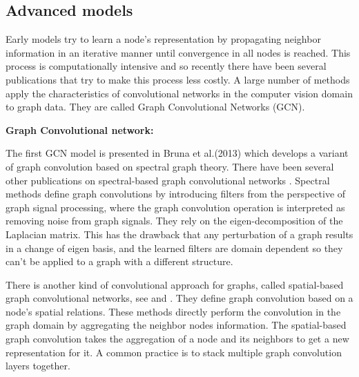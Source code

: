 \subsection{Advanced models} 





Early models try to learn a node's representation by propagating neighbor information in an iterative manner until convergence in all nodes is reached. This process is computationally intensive and so recently there have been several publications that try to make this process less costly. A large number of methods apply the characteristics of convolutional networks in the computer vision domain to graph data. They are called Graph Convolutional Networks (GCN).

\textbf{Graph Convolutional network:}






The first GCN model is presented in Bruna et al.(2013) \cite{bruna} which develops a variant of graph convolution based on spectral graph theory. There have been several other publications on spectral-based graph convolutional networks \cite{defferrard2016convolutional}.  Spectral methods define graph convolutions by introducing filters from the perspective of graph signal processing, where the graph convolution operation is interpreted as removing noise from graph signals. They rely on the eigen-decomposition of the Laplacian matrix. This has the drawback that any perturbation  of a graph results in a change of eigen basis, and the learned filters are domain dependent so they can't be applied to a graph with a different structure. 


There is another kind of convolutional approach for graphs, called spatial-based graph convolutional networks, see \cite{graphsage} and \cite{geometricdl}. They define graph convolution based on a node's spatial relations. These methods directly perform the convolution in the graph domain by aggregating the neighbor nodes  information. The spatial-based graph convolution takes the aggregation of a node and its neighbors to get a new representation for it. A common practice is to stack multiple graph convolution layers together.


